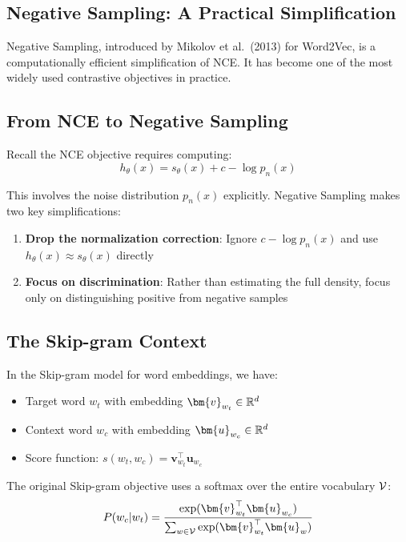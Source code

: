 \begin{notechapter}
\section{Negative Sampling: A Practical Simplification}

Negative Sampling, introduced by Mikolov et al.\ (2013) for Word2Vec, is a computationally efficient simplification of NCE. It has become one of the most widely used contrastive objectives in practice.

\subsection{From NCE to Negative Sampling}

Recall the NCE objective requires computing:
\begin{equation}
h_\theta(x) = s_\theta(x) + c - \log p_n(x)
\end{equation}

This involves the noise distribution $p_n(x)$ explicitly. Negative Sampling makes two key simplifications:

\begin{enumerate}[label=(\roman*)]
    \item \textbf{Drop the normalization correction}: Ignore $c - \log p_n(x)$ and use $h_\theta(x) \approx s_\theta(x)$ directly
    \item \textbf{Focus on discrimination}: Rather than estimating the full density, focus only on distinguishing positive from negative samples
\end{enumerate}

\subsection{The Skip-gram Context}

In the Skip-gram model for word embeddings, we have:
\begin{itemize}
    \item Target word $w_t$ with embedding $\bm{v}_{w_t} \in \R^d$
    \item Context word $w_c$ with embedding $\bm{u}_{w_c} \in \R^d$
    \item Score function: $s(w_t, w_c) = \bm{v}_{w_t}^\top \bm{u}_{w_c}$
\end{itemize}

The original Skip-gram objective uses a softmax over the entire vocabulary $\mathcal{V}$:
\begin{equation}
P(w_c | w_t) = \frac{\exp(\bm{v}_{w_t}^\top \bm{u}_{w_c})}{\sum_{w \in \vocab} \exp(\bm{v}_{w_t}^\top \bm{u}_w)}
\end{equation}


\end{notechapter}
